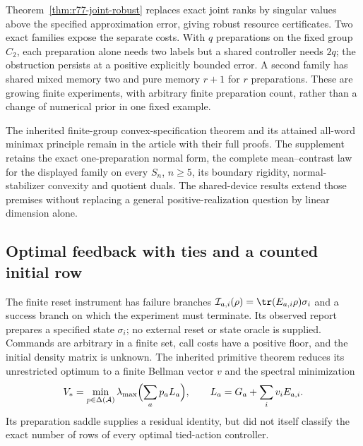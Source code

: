 Theorem~\ref{thm:r77-joint-robust} replaces exact joint ranks by singular
values above the specified approximation error, giving robust resource
certificates.  Two exact families expose the separate costs.  With
$q$ preparations on the fixed group $C_2$, each preparation alone
needs two labels but a shared controller needs $2q$; the obstruction
persists at a positive explicitly bounded error.  A second family has
shared mixed memory two and pure memory $r+1$ for $r$ preparations.
These are growing finite experiments, with arbitrary finite preparation
count, rather than a change of numerical prior in one fixed example.

The inherited finite-group convex-specification theorem and its
attained all-word minimax principle remain in the article with their
full proofs.  The supplement retains the exact one-preparation normal
form, the complete mean--contrast law for the displayed family on
every $S_n$, $n\ge5$, its boundary rigidity, normal-stabilizer
convexity and quotient duals.  The shared-device results extend those
premises without replacing a general positive-realization question
by linear dimension alone.

\subsection*{Optimal feedback with ties and a counted initial row}

The finite reset instrument has failure branches
$\mathcal I_{a,i}(\rho)=\tr(E_{a,i}\rho)\sigma_i$ and a success
branch on which the experiment must terminate.  Its observed report
prepares a specified state $\sigma_i$; no external reset or state
oracle is supplied.  Commands are arbitrary in a finite set, call
costs have a positive floor, and the initial density matrix is unknown.
The inherited primitive theorem reduces its unrestricted optimum to a
finite Bellman vector $v$ and the spectral minimization
\[
 V_* =\min_{p\in\Delta(\mathcal A)}
       \lambda_{\max}\Bigl(\sum_a p_aL_a\Bigr),
 \qquad L_a=G_a+\sum_i v_iE_{a,i}.
\]
Its preparation saddle supplies a residual identity, but did not itself
classify the exact number of rows of every optimal tied-action controller.

